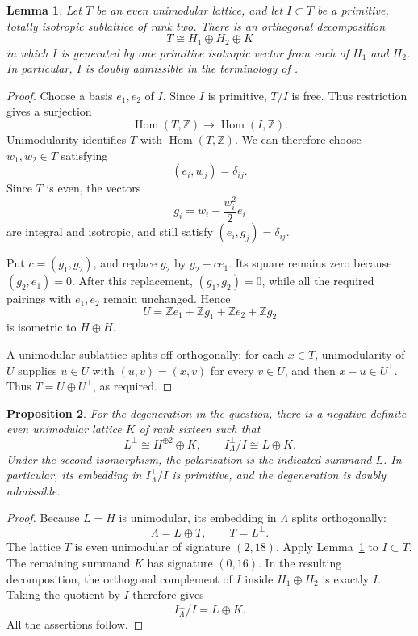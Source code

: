 \documentclass[11pt]{article}
\newcommand{\Z}{\mathbb Z}
\newtheorem{lemma}{Lemma}[section]
\newtheorem{proposition}[lemma]{Proposition}
\theoremstyle{remark}
\begin{document}
\begin{lemma}\label{lem:split}
Let \(T\) be an even unimodular lattice, and let
\(I\subset T\) be a primitive, totally isotropic sublattice of rank two.
There is an orthogonal decomposition
\[
 T\cong H_1\oplus H_2\oplus K
\]
in which \(I\) is generated by one primitive isotropic vector from each
of \(H_1\) and \(H_2\).
In particular, \(I\) is doubly admissible in the terminology of
\cite[Definition~3.31]{GT24}.
\end{lemma}

\begin{proof}
Choose a basis \(e_1,e_2\) of \(I\).
Since \(I\) is primitive, \(T/I\) is free.  Thus restriction gives a
surjection
\[
 \operatorname{Hom}(T,\Z)\longrightarrow
 \operatorname{Hom}(I,\Z).
\]
Unimodularity identifies \(T\) with \(\operatorname{Hom}(T,\Z)\).
We can therefore choose \(w_1,w_2\in T\) satisfying
\[
 (e_i,w_j)=\delta_{ij}.
\]
Since \(T\) is even, the vectors
\[
 g_i=w_i-\frac{w_i^2}{2}e_i
\]
are integral and isotropic, and still satisfy
\((e_i,g_j)=\delta_{ij}\).

Put \(c=(g_1,g_2)\), and replace \(g_2\) by \(g_2-ce_1\).
Its square remains zero because \((g_2,e_1)=0\).
After this replacement, \((g_1,g_2)=0\), while all the required
pairings with \(e_1,e_2\) remain unchanged.  Hence
\[
 U=\Z e_1+\Z g_1+\Z e_2+\Z g_2
\]
is isometric to \(H\oplus H\).

A unimodular sublattice splits off orthogonally: for each \(x\in T\),
unimodularity of \(U\) supplies \(u\in U\) with
\((u,v)=(x,v)\) for every \(v\in U\), and then \(x-u\in U^\perp\).
Thus \(T=U\oplus U^\perp\), as required.
\end{proof}

\begin{proposition}\label{prop:degeneration}
For the degeneration in the question, there is a negative-definite
even unimodular lattice \(K\) of rank sixteen such that
\[
 L^\perp\cong H^{\oplus2}\oplus K,
 \qquad
 I^\perp_\Lambda/I\cong L\oplus K.
\]
Under the second isomorphism, the polarization is the indicated
summand \(L\).  In particular, its embedding in \(I^\perp_\Lambda/I\)
is primitive, and the degeneration is doubly admissible.
\end{proposition}

\begin{proof}
Because \(L=H\) is unimodular, its embedding in \(\Lambda\) splits
orthogonally:
\[
 \Lambda=L\oplus T,
 \qquad T=L^\perp.
\]
The lattice \(T\) is even unimodular of signature \((2,18)\).
Apply Lemma~\ref{lem:split} to \(I\subset T\).
The remaining summand \(K\) has signature \((0,16)\).
In the resulting decomposition, the orthogonal complement of \(I\)
inside \(H_1\oplus H_2\) is exactly \(I\).  Taking the quotient by
\(I\) therefore gives
\[
 I^\perp_\Lambda/I=L\oplus K.
\]
All the assertions follow.
\end{proof}
\end{document}
